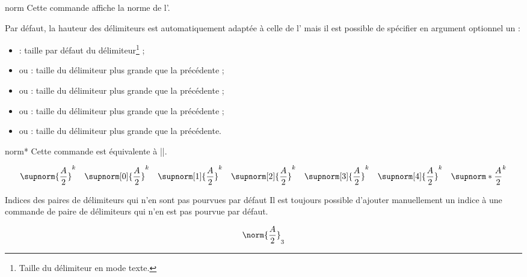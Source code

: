\documentclass[french,nolocaltoc]{nwejmart}
\newtheorem[title=Fait,style=definition]{fact}
\begin{document}
\begin{docCommand*}{norm}{}
  Cette commande affiche la norme de l'.

  Par défaut, la hauteur des délimiteurs est automatiquement adaptée à celle de
  l' mais il est possible de spécifier en argument optionnel un
   :
  \begin{itemize}
  \item {} : taille par défaut du délimiteur\footnote{Taille du
      délimiteur en mode texte.} ;
  \item {} ou  : taille du délimiteur plus grande
    que la précédente ;
  \item {} ou  : taille du délimiteur plus grande
    que la précédente ;
  \item {} ou  : taille du délimiteur plus grande
    que la précédente ;
  \item {} ou  : taille du délimiteur plus grande
    que la précédente.
  \end{itemize}
\end{docCommand*}

\begin{docCommand}{norm*}{}
  Cette commande est équivalente à ||.
\end{docCommand}

\begin{bodycode}
\begin{equation}
\supnorm{\frac{A}{2}}^k    \quad
\supnorm[0]{\frac{A}{2}}^k \quad
\supnorm[1]{\frac{A}{2}}^k \quad
\supnorm[2]{\frac{A}{2}}^k \quad
\supnorm[3]{\frac{A}{2}}^k \quad
\supnorm[4]{\frac{A}{2}}^k \quad
\supnorm*{\frac{A}{2}}^k
\end{equation}
\end{bodycode}

\begin{dbremark}{Indices des paires de délimiteurs qui n'en sont pas pourvues par défaut}{}
  Il est toujours possible d'ajouter manuellement un indice à une commande de
  paire de délimiteurs qui n'en est pas pourvue par défaut.
\begin{bodycode}
\begin{equation}
\norm{\frac{A}{2}}_3
\end{equation}
\end{bodycode}
\end{dbremark}
\end{document}
